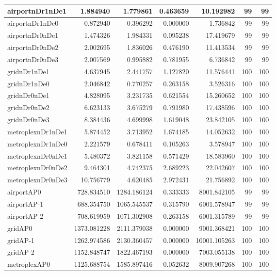 \begin{longtable}{|l|r|r|r|r|r|r|}
\endlastfoot
airportnDr1nDe1 & 1.884940 & 1.779861 & 0.463659 & 10.192982 & 99 & 99 \\ \hline
airportnDr1nDe0 & 0.872940 & 0.396292 & 0.000000 & 1.736842 & 99 & 99 \\ \hline
airportnDr0nDe1 & 1.474326 & 1.984331 & 0.095238 & 17.419679 & 99 & 99 \\ \hline
airportnDr0nDe2 & 2.002695 & 1.836026 & 0.476190 & 11.413534 & 99 & 99 \\ \hline
airportnDr0nDe3 & 2.007569 & 0.995882 & 0.781955 & 6.736842 & 99 & 99 \\ \hline
gridnDr1nDe1 & 4.637945 & 2.441757 & 1.127820 & 11.576441 & 100 & 100 \\ \hline
gridnDr1nDe0 & 2.046842 & 0.770257 & 0.263158 & 3.526316 & 100 & 100 \\ \hline
gridnDr0nDe1 & 4.828095 & 3.231735 & 0.621554 & 15.260652 & 100 & 100 \\ \hline
gridnDr0nDe2 & 6.623133 & 3.675279 & 0.791980 & 17.438596 & 100 & 100 \\ \hline
gridnDr0nDe3 & 8.384436 & 4.699998 & 1.619048 & 23.842105 & 100 & 100 \\ \hline
metroplexnDr1nDe1 & 5.874452 & 3.713952 & 1.674185 & 14.052632 & 100 & 100 \\ \hline
metroplexnDr1nDe0 & 2.221579 & 0.678411 & 0.105263 & 3.578947 & 100 & 100 \\ \hline
metroplexnDr0nDe1 & 5.480372 & 3.821158 & 0.571429 & 18.583960 & 100 & 100 \\ \hline
metroplexnDr0nDe2 & 9.464301 & 4.742375 & 2.689223 & 22.042607 & 100 & 100 \\ \hline
metroplexnDr0nDe3 & 10.756779 & 4.620485 & 2.972431 & 21.756892 & 100 & 100 \\ \hline
airportAP0 & 728.834510 & 1284.186124 & 0.333333 & 8001.842105 & 99 & 99 \\ \hline
airportAP-1 & 688.354750 & 1065.545537 & 0.315790 & 6001.578947 & 99 & 99 \\ \hline
airportAP-2 & 708.619959 & 1071.302908 & 0.263158 & 6001.315789 & 99 & 99 \\ \hline
gridAP0 & 1373.081228 & 2111.379038 & 0.000000 & 9001.368421 & 100 & 100 \\ \hline
gridAP-1 & 1262.974586 & 2130.360457 & 0.000000 & 10001.105263 & 100 & 100 \\ \hline
gridAP-2 & 1152.848747 & 1822.467193 & 0.000000 & 7003.055138 & 100 & 100 \\ \hline
metroplexAP0 & 1125.688754 & 1585.897416 & 0.052632 & 8009.907268 & 100 & 100 \\ \hline

\end{longtable}
